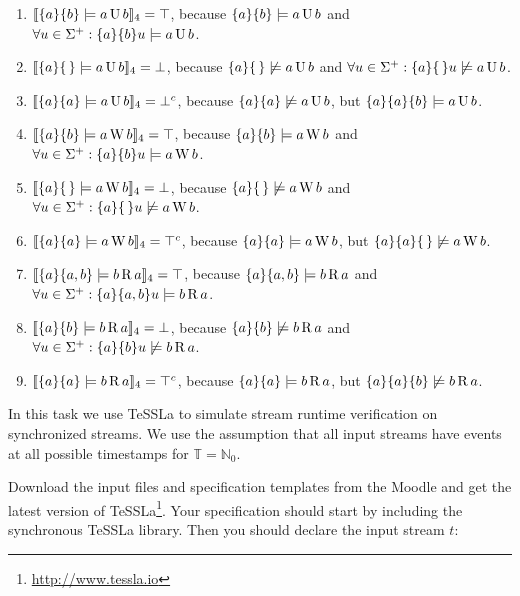 \documentclass[language=en,sheet=7,prefix]{exercise}
\newcommand{\sem}[1]{\llbracket #1\rrbracket}
\begin{document}
\begin{solution}
  \begin{enumerate}
    \item $\sem{\{a\}\{b\} \models a \LTLuntil b}_4 = \top$, because $\{a\}\{b\} \models a \operatorname{\relax{U}} b$ and $\forall u \in \Sigma^+: \{a\}\{b\}u \models a \operatorname{\relax{U}} b$.
    \item $\sem{\{a\}\{\,\} \models a \LTLuntil b}_4 = \bot$, because $\{a\}\{\,\} \not\models a \operatorname{\relax{U}} b$ and $\forall u \in \Sigma^+: \{a\}\{\,\}u \not\models a \operatorname{\relax{U}} b$.
    \item $\sem{\{a\}\{a\} \models a \LTLuntil b}_4 = \bot^c$, because $\{a\}\{a\} \not\models a \operatorname{\relax{U}} b$, but $\{a\}\{a\}\{b\} \models a \operatorname{\relax{U}} b$.
    \item $\sem{\{a\}\{b\} \models a \LTLweakuntil b}_4 = \top$, because $\{a\}\{b\} \models a \operatorname{\relax{W}} b$ and $\forall u \in \Sigma^+: \{a\}\{b\}u \models a \operatorname{\relax{W}} b$.
    \item $\sem{\{a\}\{\,\} \models a \LTLweakuntil b}_4 = \bot$, because $\{a\}\{\,\} \not\models a \operatorname{\relax{W}} b$ and $\forall u \in \Sigma^+: \{a\}\{\,\}u \not\models a \operatorname{\relax{W}} b$.
    \item $\sem{\{a\}\{a\} \models a \LTLweakuntil b}_4 = \top^c$, because $\{a\}\{a\} \models a \operatorname{\relax{W}} b$, but $\{a\}\{a\}\{\,\} \not\models a \operatorname{\relax{W}} b$.
    \item $\sem{\{a\}\{a,b\} \models b \LTLrelease a}_4 = \top$, because $\{a\}\{a,b\} \models b \operatorname{\relax{R}} a$ and $\forall u \in \Sigma^+: \{a\}\{a,b\}u \models b \operatorname{\relax{R}} a$.
    \item $\sem{\{a\}\{b\} \models b \LTLrelease a}_4 = \bot$, because $\{a\}\{b\} \not\models b \operatorname{\relax{R}} a$ and $\forall u \in \Sigma^+: \{a\}\{b\}u \not\models b \operatorname{\relax{R}} a$.
    \item $\sem{\{a\}\{a\} \models b \LTLrelease a}_4 = \top^c$, because $\{a\}\{a\} \models b \operatorname{\relax{R}} a$, but $\{a\}\{a\}\{b\} \not\models b \operatorname{\relax{R}} a$.
  \end{enumerate}
\end{solution}


In this task we use TeSSLa to simulate stream runtime verification on synchronized streams. We use the assumption that all input streams have events at all possible timestamps for $\mathbb T = \mathbb N_0$.

Download the input files and specification templates from the Moodle and get the latest version of TeSSLa\footnote{\url{http://www.tessla.io}}.
Your specification should start by including the synchronous TeSSLa library. Then you should declare the input stream $t$:
\end{document}
